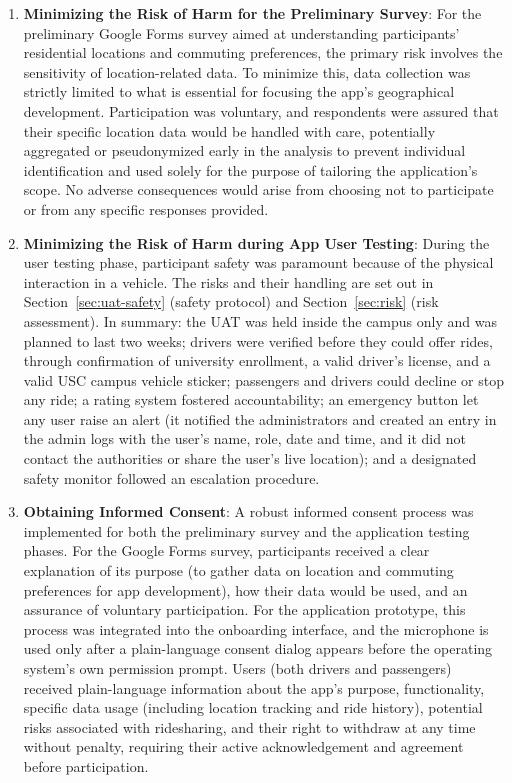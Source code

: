 \begin{enumerate}
    \item \textbf{Minimizing the Risk of Harm for the Preliminary Survey}: For the preliminary Google Forms survey aimed at understanding participants' residential locations and commuting preferences, the primary risk involves the sensitivity of location-related data. To minimize this, data collection was strictly limited to what is essential for focusing the app's geographical development. Participation was voluntary, and respondents were assured that their specific location data would be handled with care, potentially aggregated or pseudonymized early in the analysis to prevent individual identification and used solely for the purpose of tailoring the application's scope. No adverse consequences would arise from choosing not to participate or from any specific responses provided.

    \item \textbf{Minimizing the Risk of Harm during App User Testing}: During the user testing phase, participant safety was paramount because of the physical interaction in a vehicle. The risks and their handling are set out in Section~\ref{sec:uat-safety} (safety protocol) and Section~\ref{sec:risk} (risk assessment). In summary: the UAT was held inside the campus only and was planned to last two weeks; drivers were verified before they could offer rides, through confirmation of university enrollment, a valid driver's license, and a valid USC campus vehicle sticker; passengers and drivers could decline or stop any ride; a rating system fostered accountability; an emergency button let any user raise an alert (it notified the administrators and created an entry in the admin logs with the user's name, role, date and time, and it did not contact the authorities or share the user's live location); and a designated safety monitor followed an escalation procedure.

    \item \textbf{Obtaining Informed Consent}: A robust informed consent process was implemented for both the preliminary survey and the application testing phases. For the Google Forms survey, participants received a clear explanation of its purpose (to gather data on location and commuting preferences for app development), how their data would be used, and an assurance of voluntary participation. For the application prototype, this process was integrated into the onboarding interface, and the microphone is used only after a plain-language consent dialog appears before the operating system's own permission prompt. Users (both drivers and passengers) received plain-language information about the app’s purpose, functionality, specific data usage (including location tracking and ride history), potential risks associated with ridesharing, and their right to withdraw at any time without penalty, requiring their active acknowledgement and agreement before participation.


\end{enumerate}
